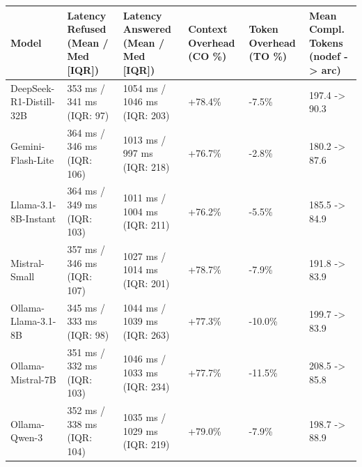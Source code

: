 \begin{tabular}{llllll}
\toprule
Model & Latency Refused (Mean / Med [IQR]) & Latency Answered (Mean / Med [IQR]) & Context Overhead (CO \%) & Token Overhead (TO \%) & Mean Compl. Tokens (nodef -> arc) \\
\midrule
DeepSeek-R1-Distill-32B & 353 ms / 341 ms (IQR: 97) & 1054 ms / 1046 ms (IQR: 203) & +78.4\% & -7.5\% & 197.4 -> 90.3 \\
Gemini-Flash-Lite & 364 ms / 346 ms (IQR: 106) & 1013 ms / 997 ms (IQR: 218) & +76.7\% & -2.8\% & 180.2 -> 87.6 \\
Llama-3.1-8B-Instant & 364 ms / 349 ms (IQR: 103) & 1011 ms / 1004 ms (IQR: 211) & +76.2\% & -5.5\% & 185.5 -> 84.9 \\
Mistral-Small & 357 ms / 346 ms (IQR: 107) & 1027 ms / 1014 ms (IQR: 201) & +78.7\% & -7.9\% & 191.8 -> 83.9 \\
Ollama-Llama-3.1-8B & 345 ms / 333 ms (IQR: 98) & 1044 ms / 1039 ms (IQR: 263) & +77.3\% & -10.0\% & 199.7 -> 83.9 \\
Ollama-Mistral-7B & 351 ms / 332 ms (IQR: 103) & 1046 ms / 1033 ms (IQR: 234) & +77.7\% & -11.5\% & 208.5 -> 85.8 \\
Ollama-Qwen-3 & 352 ms / 338 ms (IQR: 104) & 1035 ms / 1029 ms (IQR: 219) & +79.0\% & -7.9\% & 198.7 -> 88.9 \\
\bottomrule
\end{tabular}
